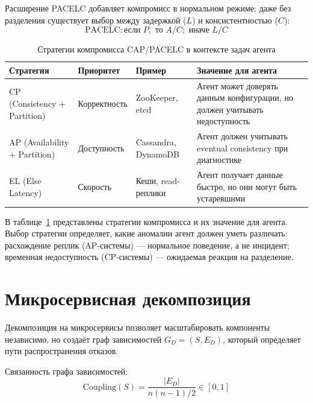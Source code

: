 Расширение PACELC \cite{abadi_pacelc} добавляет компромисс в нормальном режиме: даже без разделения существует выбор между задержкой ($L$) и консистентностью ($C$):
\begin{equation}
\text{PACELC}: \text{если } P, \text{ то } A/C; \text{ иначе } L/C
\label{eq:pacelc}
\end{equation}

\begin{table}[H]
\centering
\small
\caption{Стратегии компромисса CAP/PACELC в контексте задач агента}
\label{tab:cap_strategies}
\setlength{\tabcolsep}{2pt}
\begin{tabularx}{\textwidth}{|p{3.5cm}|p{3cm}|p{3cm}|>{\raggedright\arraybackslash}X|}
\hline
\textbf{Стратегия} & \textbf{Приоритет} & \textbf{Пример} & \textbf{Значение для агента} \\
\hline
CP (Consistency + Partition) & Корректность & ZooKeeper, etcd & Агент может доверять данным конфигурации, но должен учитывать недоступность \\
\hline
AP (Availability + Partition) & Доступность & Cassandra, DynamoDB & Агент должен учитывать eventual consistency при диагностике \\
\hline
EL (Else Latency) & Скорость & Кеши, read-реплики & Агент получает данные быстро, но они могут быть устаревшими \\
\hline
\end{tabularx}
\end{table}

В таблице~\ref{tab:cap_strategies} представлены стратегии компромисса и их значение для агента. Выбор стратегии определяет, какие аномалии агент должен уметь различать: расхождение реплик (AP-системы) --- нормальное поведение, а не инцидент; временная недоступность (CP-системы) --- ожидаемая реакция на разделение.

\section{Микросервисная декомпозиция}

Декомпозиция на микросервисы \cite{newman_microservices,richardson_microservices_patterns,ieee_microservices} позволяет масштабировать компоненты независимо, но создаёт граф зависимостей $G_D = (S, E_D)$, который определяет пути распространения отказов.

Связанность графа зависимостей:
\begin{equation}
\text{Coupling}(S) = \frac{|E_D|}{n(n-1)/2} \in [0, 1]
\label{eq:coupling_metric}
\end{equation}

